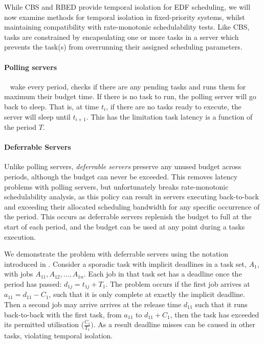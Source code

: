 While \gls{CBS} and \gls{RBED} provide temporal isolation for \gls{EDF} scheduling, we will now
examine methods for temporal isolation in fixed-priority systems, whilst maintaining compatibility
with rate-monotonic schedulability tests.  Like \gls{CBS}, tasks are constrained by encapsulating
one or more tasks in a server which prevents the task(s) from overrunning their assigned scheduling
parameters.

\paragraph{Polling servers}\label{p:polling-servers}~\citep{Lehoczky_LS_87} wake every period,
checks if there are any pending tasks and runs them for maximum their budget time. If there is no
task to run, the polling server will go back to sleep. That is, at time $t_{i}$, if there are no
tasks ready to execute, the server will sleep until $t_{i+1}$. This has the limitation task latency
is a function of the period $T$.

\paragraph{Deferrable Servers}\label{p:ds} Unlike polling servers, \emph{deferrable
servers}\citep{Lehoczky_LS_87, Strosnider_LS_95} preserve any unused budget across periods, although
the budget can never be exceeded.  This removes latency problems with polling servers, but
unfortunately breaks rate-monotonic schedulability analysis, as this policy can result in servers
executing back-to-back and exceeding their allocated scheduling bandwidth for any specific occurrence of
the period.  This occurs as deferrable servers replenish the budget to full at the start of each
period, and the budget can be used at any point during a tasks execution. 

We demonstrate the problem with deferrable servers using the notation introduced in
. Consider a sporadic task with implicit deadlines in a task set, 
$A_{1}$, with jobs $A_{11}, A_{12}, ..., A_{1n}$. Each job in that task set has a deadline once the
period has passed: $d_{1j} = t_{1j} + T_{1}$. The problem occurs if the first job arrives at $a_{11}
= d_{11} - C_{1}$, such that it is only complete at exactly the implicit deadline.  
Then a second job may arrive arrives at the release time $d_{11}$ such that it runs back-to-back with the first
task, from $a_11$ to $d_{11} + C_{1}$, then the task has exceeded its permitted utilisation 
($\frac{C_{1}}{T_{1}})$. As a result deadline misses can be caused in other
tasks, violating temporal isolation.

